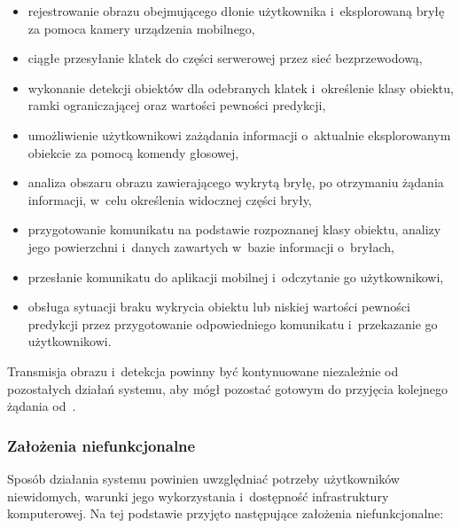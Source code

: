 \begin{itemize}
    \item rejestrowanie obrazu obejmującego dłonie użytkownika i~eksplorowaną bryłę za pomoca kamery urządzenia mobilnego,
    \item ciągłe przesyłanie klatek do części serwerowej przez sieć bezprzewodową,
    \item wykonanie detekcji obiektów dla odebranych klatek i~określenie klasy obiektu, ramki ograniczającej oraz wartości pewności predykcji,
    \item umożliwienie użytkownikowi zażądania informacji o~aktualnie eksplorowanym obiekcie za pomocą komendy głosowej,
    \item analiza obszaru obrazu zawierającego wykrytą bryłę, po otrzymaniu żądania informacji, w~celu określenia widocznej części bryły,
    \item przygotowanie komunikatu na podstawie rozpoznanej klasy obiektu, analizy jego powierzchni i~danych zawartych w~bazie informacji o~bryłach,
    \item przesłanie komunikatu do aplikacji mobilnej i~odczytanie go użytkownikowi,
    \item obsługa sytuacji braku wykrycia obiektu lub niskiej wartości pewności predykcji przez przygotowanie odpowiedniego komunikatu i~przekazanie go użytkownikowi.
\end{itemize}

Transmisja obrazu i~detekcja powinny być kontynuowane niezależnie od pozostałych działań systemu, aby mógł pozostać gotowym do przyjęcia kolejnego żądania od~.

\subsubsection{Założenia niefunkcjonalne}
\label{ssec:założenia-niefunkcjonalne}

Sposób działania systemu powinien uwzględniać potrzeby użytkowników niewidomych, warunki jego wykorzystania i~dostępność infrastruktury komputerowej. Na tej podstawie przyjęto następujące założenia niefunkcjonalne:

